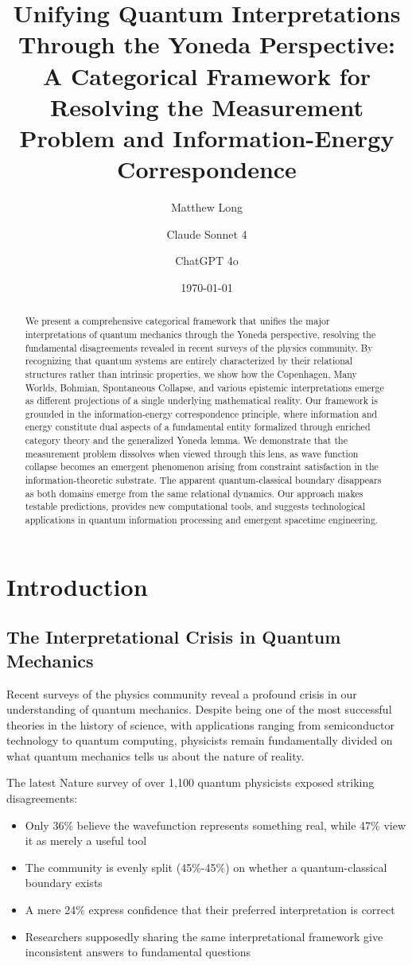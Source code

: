 \documentclass[12pt,a4paper]{article}
\title{Unifying Quantum Interpretations Through the Yoneda Perspective: A Categorical Framework for Resolving the Measurement Problem and Information-Energy Correspondence}
\author[1]{Matthew Long}
\author[2]{Claude Sonnet 4}
\author[3]{ChatGPT 4o}
\affil[1]{Yoneda AI}
\affil[2]{Anthropic}
\affil[3]{OpenAI}
\date{\today}
\begin{document}
\maketitle

\begin{abstract}
We present a comprehensive categorical framework that unifies the major interpretations of quantum mechanics through the Yoneda perspective, resolving the fundamental disagreements revealed in recent surveys of the physics community. By recognizing that quantum systems are entirely characterized by their relational structures rather than intrinsic properties, we show how the Copenhagen, Many Worlds, Bohmian, Spontaneous Collapse, and various epistemic interpretations emerge as different projections of a single underlying mathematical reality. Our framework is grounded in the information-energy correspondence principle, where information and energy constitute dual aspects of a fundamental entity formalized through enriched category theory and the generalized Yoneda lemma. We demonstrate that the measurement problem dissolves when viewed through this lens, as wave function collapse becomes an emergent phenomenon arising from constraint satisfaction in the information-theoretic substrate. The apparent quantum-classical boundary disappears as both domains emerge from the same relational dynamics. Our approach makes testable predictions, provides new computational tools, and suggests technological applications in quantum information processing and emergent spacetime engineering.
\end{abstract}

\section{Introduction}

\subsection{The Interpretational Crisis in Quantum Mechanics}

Recent surveys of the physics community reveal a profound crisis in our understanding of quantum mechanics. Despite being one of the most successful theories in the history of science, with applications ranging from semiconductor technology to quantum computing, physicists remain fundamentally divided on what quantum mechanics tells us about the nature of reality.

The latest Nature survey of over 1,100 quantum physicists exposed striking disagreements:
\begin{itemize}
\item Only 36\% believe the wavefunction represents something real, while 47\% view it as merely a useful tool
\item The community is evenly split (45\%-45\%) on whether a quantum-classical boundary exists
\item A mere 24\% express confidence that their preferred interpretation is correct
\item Researchers supposedly sharing the same interpretational framework give inconsistent answers to fundamental questions
\end{itemize}
\end{document}
